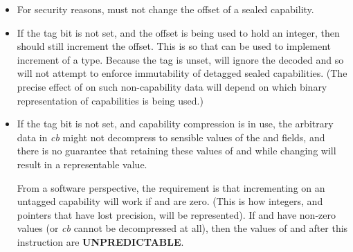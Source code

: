 \begin{itemize}
\item
For security reasons,  must not change the offset
of a sealed capability.
\item
If the tag bit is not set, and the offset is being used to hold an integer,
then  should still increment the offset. This is
so that  can be used to implement increment of
a  type.
Because the tag is unset, 
will ignore the decoded \cotype{} and so will not attempt to enforce
immutability of detagged sealed capabilities.
(The precise effect of  on such
non-capability data will depend on which binary representation of
capabilities is being used.)
\item
If the tag bit is not set, and capability compression is in use,
the arbitrary data in \emph{cb} might not decompress to sensible values
of the \cbase{} and \clength{} fields, and there is no guarantee that
retaining these values of \cbase{} and \clength{} while changing
\coffset{} will result in a representable value.

From a software perspective, the requirement is that incrementing \coffset{}
on an untagged capability will work if \cbase{} and \clength{} are zero. (This
is how integers, and pointers that have lost precision, will be represented).
If \cbase{} and \clength{} have non-zero values (or \emph{cb} cannot be
decompressed at all), then the values of \cbase{} and \clength{} after this
instruction are \textbf{UNPREDICTABLE}.
\end{itemize}
